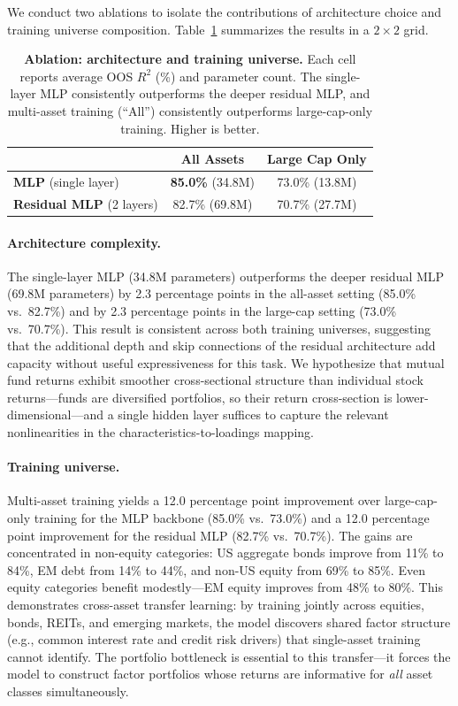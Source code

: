 We conduct two ablations to isolate the contributions of architecture choice and training universe composition. Table~\ref{tab:ablation} summarizes the results in a $2 \times 2$ grid.

\begin{table}[t]
\centering
\caption{\textbf{Ablation: architecture and training universe.} Each cell reports average OOS $R^2$ (\%) and parameter count. The single-layer MLP consistently outperforms the deeper residual MLP, and multi-asset training (``All'') consistently outperforms large-cap-only training. Higher is better.}
\label{tab:ablation}
\begin{tabular}{lcc}
\toprule
 & \textbf{All Assets} & \textbf{Large Cap Only} \\
\midrule
\textbf{MLP} (single layer)     & \textbf{85.0\%} (34.8M) & 73.0\% (13.8M) \\
\textbf{Residual MLP} (2 layers) & 82.7\% (69.8M) & 70.7\% (27.7M) \\
\bottomrule
\end{tabular}
\end{table}

\paragraph{Architecture complexity.}
The single-layer MLP (34.8M parameters) outperforms the deeper residual MLP (69.8M parameters) by 2.3 percentage points in the all-asset setting (85.0\% vs.\ 82.7\%) and by 2.3 percentage points in the large-cap setting (73.0\% vs.\ 70.7\%). This result is consistent across both training universes, suggesting that the additional depth and skip connections of the residual architecture add capacity without useful expressiveness for this task. We hypothesize that mutual fund returns exhibit smoother cross-sectional structure than individual stock returns---funds are diversified portfolios, so their return cross-section is lower-dimensional---and a single hidden layer suffices to capture the relevant nonlinearities in the characteristics-to-loadings mapping.

\paragraph{Training universe.}
Multi-asset training yields a 12.0 percentage point improvement over large-cap-only training for the MLP backbone (85.0\% vs.\ 73.0\%) and a 12.0 percentage point improvement for the residual MLP (82.7\% vs.\ 70.7\%). The gains are concentrated in non-equity categories: US aggregate bonds improve from 11\% to 84\%, EM debt from 14\% to 44\%, and non-US equity from 69\% to 85\%. Even equity categories benefit modestly---EM equity improves from 48\% to 80\%. This demonstrates cross-asset transfer learning: by training jointly across equities, bonds, REITs, and emerging markets, the model discovers shared factor structure (e.g., common interest rate and credit risk drivers) that single-asset training cannot identify. The portfolio bottleneck is essential to this transfer---it forces the model to construct factor portfolios whose returns are informative for \emph{all} asset classes simultaneously.

